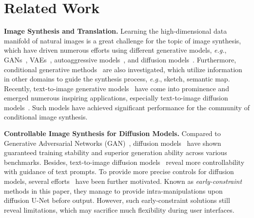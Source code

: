 \documentclass{article}
\begin{document}
\section{Related Work}



\textbf{Image Synthesis and Translation.} Learning the high-dimensional data manifold of natural images is a great challenge for the topic of image synthesis, which have driven numerous efforts using different generative models, \textit{e.g.}, GANs~\cite{karras2019style, brock2018large, karras2020analyzing, miyato2018spectral, karras2017progressive, kang2023scaling}, VAEs~\cite{van2017neural, razavi2019generating}, autoaggressive models~\cite{esser2021taming, chang2022maskgit, yu2022scaling, lee2022autoregressive, chang2023muse, li2022mage}, and diffusion models~\cite{ho2020denoising, ho2022cascaded, song2020score, nichol2021improved, song2020denoising, blattmann2022retrieval, saharia2022palette, choi2021ilvr}. Furthermore, conditional generative methods~\cite{isola2017image, wang2018high, park2019semantic, esser2021taming, yu2022scaling, lee2022autoregressive, saharia2022palette, rombach2022high} are also investigated, which utilize information in other domains to guide the synthesis process, \textit{e.g.}, sketch, semantic map. Recently, text-to-image generative models~\cite{chang2023muse, gafni2022make, brooks2022instructpix2pix, rombach2022high, kang2023scaling} have come into prominence and emerged numerous inspiring applications, especially text-to-image diffusion models~\cite{rombach2022high, huang2023composer, saharia2022photorealistic, nichol2021glide, gu2022vector, avrahami2022blended, kim2022diffusionclip, brooks2022instructpix2pix, gafni2022make, kawar2022imagic, liu2023more}. Such models have achieved significant performance for the community of conditional image synthesis. 

\textbf{Controllable Image Synthesis for Diffusion Models.} Compared to Generative Adversarial Networks (GAN)~\cite{karras2019style, brock2018large, karras2020analyzing, miyato2018spectral, karras2017progressive, kang2023scaling, liang2020cpgan, zhang2021cross, tao2020df, zhang2021dtgan, cheng2020rifegan, ruan2021dae}, diffusion models~\cite{ho2020denoising, ho2022cascaded, song2020score, nichol2021improved, song2020denoising, blattmann2022retrieval, gu2022vector, dhariwal2021diffusion, rombach2022high} have shown guaranteed training stability and superior generation ability across various benchmarks. Besides, text-to-image diffusion models~\cite{rombach2022high, gu2022vector} reveal more controllability with guidance of text prompts. To provide more precise controls for diffusion models, several efforts~\cite{zhang2023adding, mou2023t2i} have been further motivated. Known as \textit{early-constraint} methods in this paper, they manage to provide intra-manipulations upon diffusion U-Net before output. However, such early-constraint solutions still reveal limitations, which may sacrifice much flexibility during user interfaces.
\end{document}
